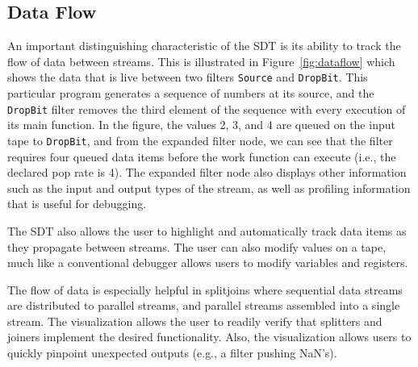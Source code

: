 \documentclass[times, 10pt,twocolumn]{article}
\begin{document}

\subsection{Data Flow}


An important distinguishing characteristic  of the SDT is its ability
to track  the flow  of data between  streams.  This is  illustrated in
Figure~\ref{fig:dataflow} which  shows the  data that is  live between
two  filters  \texttt{Source}  and \texttt{DropBit}.  This  particular
program  generates  a sequence  of  numbers  at  its source,  and  the
\texttt{DropBit} filter removes the third element of the sequence with
every execution of its main function.  In the figure, the values 2, 3,
and 4 are  queued on the input tape to  \texttt{DropBit}, and from the
expanded filter node, we can  see that the filter requires four queued
data items  before the work  function can execute (i.e.,  the declared
pop rate is 4). The expanded filter node also displays other
information such as the input and output types of the stream, as well
as profiling information that is useful for debugging.

The SDT also allows the user to highlight and automatically track data
items as  they propagate  between streams.  The  user can  also modify
values on  a tape, much like  a conventional debugger  allows users to
modify variables and registers.

The flow of data is especially helpful in splitjoins where sequential
data streams are distributed to parallel streams, and parallel streams
assembled into a single stream. The visualization allows the user to
readily  verify  that  splitters  and joiners  implement  the  desired
functionality.  Also,  the   visualization  allows  users  to  quickly
pinpoint unexpected outputs (e.g., a filter pushing NaN's).

\end{document}
